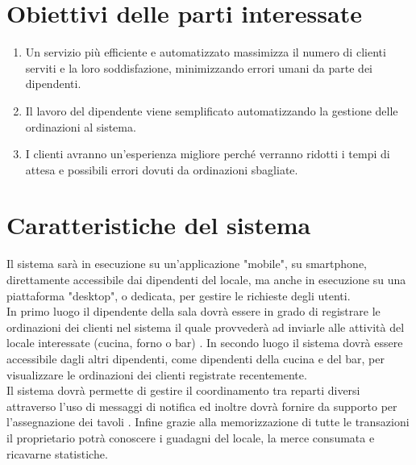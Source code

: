 \section{Obiettivi delle parti interessate}
\begin{enumerate}
    \item Un servizio più efficiente e automatizzato massimizza il numero di clienti serviti e la loro soddisfazione, minimizzando errori umani da parte dei dipendenti.
    \item Il lavoro del dipendente viene semplificato automatizzando la gestione delle ordinazioni al sistema.
    \item I clienti avranno un’esperienza migliore perché verranno ridotti i tempi di attesa e possibili errori dovuti da ordinazioni sbagliate. 
\end{enumerate}

\section{Caratteristiche del sistema}

Il sistema sarà in esecuzione su un’applicazione "mobile", su smartphone, direttamente accessibile dai dipendenti del locale, ma anche in esecuzione su una piattaforma "desktop", o dedicata, per gestire le richieste degli utenti. \\
In primo luogo il dipendente della sala dovrà essere in grado di registrare le ordinazioni dei clienti nel sistema il quale provvederà ad inviarle alle attività del locale interessate (cucina, forno o bar) . In secondo luogo il sistema dovrà essere accessibile dagli altri dipendenti, come dipendenti della cucina e del bar, per visualizzare le ordinazioni dei clienti registrate recentemente. \\Il sistema dovrà permette di gestire il coordinamento tra reparti diversi attraverso l'uso di messaggi di notifica ed inoltre dovrà fornire da supporto per l’assegnazione dei tavoli .
Infine grazie alla memorizzazione di tutte le transazioni il proprietario potrà conoscere i guadagni del locale, la merce consumata e ricavarne statistiche.



